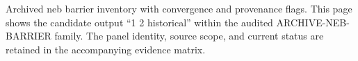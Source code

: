 Archived neb barrier inventory with convergence and provenance flags. This page shows the candidate output ``1 2 historical'' within the audited ARCHIVE-NEB-BARRIER family. The panel identity, source scope, and current status are retained in the accompanying evidence matrix.
